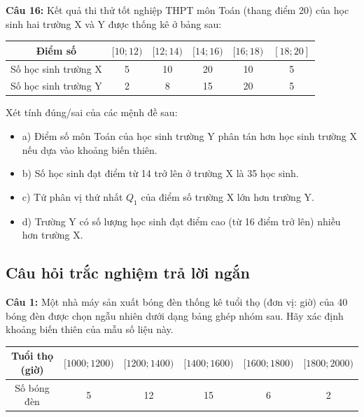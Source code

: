 \documentclass[12pt]{article}
\begin{document}
	\vspace{4mm}
	
	\noindent \textbf{Câu 16:} Kết quả thi thử tốt nghiệp THPT môn Toán (thang điểm 20) của học sinh hai trường X và Y được thống kê ở bảng sau:
	\begin{center}
		\renewcommand{\arraystretch}{1.3}
		\begin{tabular}{|c|c|c|c|c|c|}
			\hline
			Điểm số & $[10; 12)$ & $[12; 14)$ & $[14; 16)$ & $[16; 18)$ & $[18; 20]$ \\
			\hline
			Số học sinh trường X & 5 & 10 & 20 & 10 & 5 \\
			\hline
			Số học sinh trường Y & 2 & 8 & 15 & 20 & 5 \\
			\hline
		\end{tabular}
	\end{center}
	Xét tính đúng/sai của các mệnh đề sau:
	\begin{itemize}[label=, leftmargin=*]
		\item a) Điểm số môn Toán của học sinh trường Y phân tán hơn học sinh trường X nếu dựa vào khoảng biến thiên.
		\item b) Số học sinh đạt điểm từ 14 trở lên ở trường X là 35 học sinh.
		\item c) Tứ phân vị thứ nhất $Q_1$ của điểm số trường X lớn hơn trường Y.
		\item d) Trường Y có số lượng học sinh đạt điểm cao (từ 16 điểm trở lên) nhiều hơn trường X.
	\end{itemize}
	
	
	\subsection{Câu hỏi trắc nghiệm trả lời ngắn}
	
	\noindent \textbf{Câu 1:} Một nhà máy sản xuất bóng đèn thống kê tuổi thọ (đơn vị: giờ) của 40 bóng đèn được chọn ngẫu nhiên dưới dạng bảng ghép nhóm sau. Hãy xác định khoảng biến thiên của mẫu số liệu này.
	\begin{center}
		\renewcommand{\arraystretch}{1.3}
		\begin{tabular}{|c|c|c|c|c|c|}
			\hline
			Tuổi thọ (giờ) & $[1000; 1200)$ & $[1200; 1400)$ & $[1400; 1600)$ & $[1600; 1800)$ & $[1800; 2000)$ \\
			\hline
			Số bóng đèn & 5 & 12 & 15 & 6 & 2 \\
			\hline
		\end{tabular}
	\end{center}
	
\end{document}
